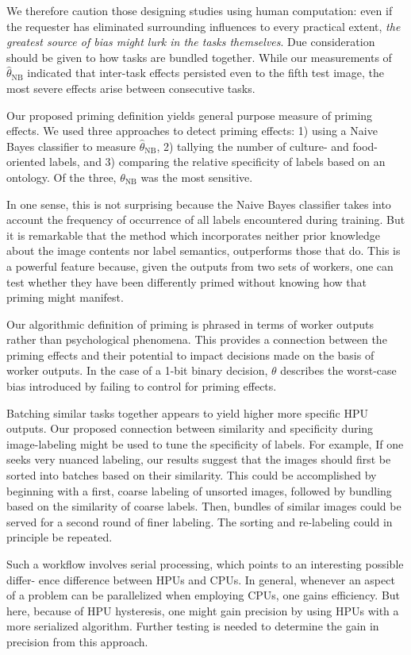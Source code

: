 \documentclass[12pt]{article}
\begin{document}
We therefore caution those designing studies using human computation: even if 
the requester has eliminated surrounding influences to every practical extent, 
\textit{the greatest source of bias might lurk in the tasks themselves}. Due 
consideration should be given to how tasks are bundled together. While our 
measurements of $\hat{\theta}_\mathrm{NB}$ indicated that inter-task effects 
persisted even to the fifth test image, the most severe effects arise between 
consecutive tasks.

Our proposed priming definition yields general purpose measure of priming 
effects. We used three approaches to detect priming effects: 1) using a Naive 
Bayes classifier to measure $\hat{\theta}_\mathrm{NB}$, 2) tallying the 
number of culture- and food-oriented labels, and 3) comparing the relative
specificity of labels based on an ontology. Of the three, $\theta_\mathrm{NB}$ 
was the most sensitive.

In one sense, this is not surprising because the Naive Bayes classifier takes 
into account the frequency of occurrence of all labels encountered during 
training. But it is remarkable that the method which incorporates neither 
prior knowledge about the image contents nor label semantics, outperforms 
those that do. This is a powerful feature because, given the outputs from two 
sets of workers, one can test whether they have been differently primed 
without knowing how that priming might manifest.

Our algorithmic definition of priming is phrased in terms of worker outputs 
rather than psychological phenomena. This provides a connection between the 
priming effects and their potential to impact decisions made on the basis of 
worker outputs. In the case of a 1-bit binary decision, $\theta$ describes the 
worst-case bias introduced by failing to control for priming effects.

Batching similar tasks together appears to yield higher more specific HPU 
outputs. Our proposed connection between similarity and specificity during 
image-labeling might be used to tune the specificity of labels. For example, 
If one seeks very nuanced labeling, our results suggest that the images 
should first be sorted into batches based on their similarity. This could be 
accomplished by beginning with a first, coarse labeling of unsorted images, 
followed by bundling based on the similarity of coarse labels. Then, bundles 
of similar images could be served for a second round of finer labeling. The 
sorting and re-labeling could in principle be repeated.

Such a workflow involves serial processing, which points to an interesting 
possible differ- ence difference between HPUs and CPUs. In general, whenever 
an aspect of a problem can be parallelized when employing CPUs, one gains 
efficiency. But here, because of HPU hysteresis, one might gain precision by 
using HPUs with a more serialized algorithm. Further testing is needed to 
determine the gain in precision from this approach.




\end{document}
